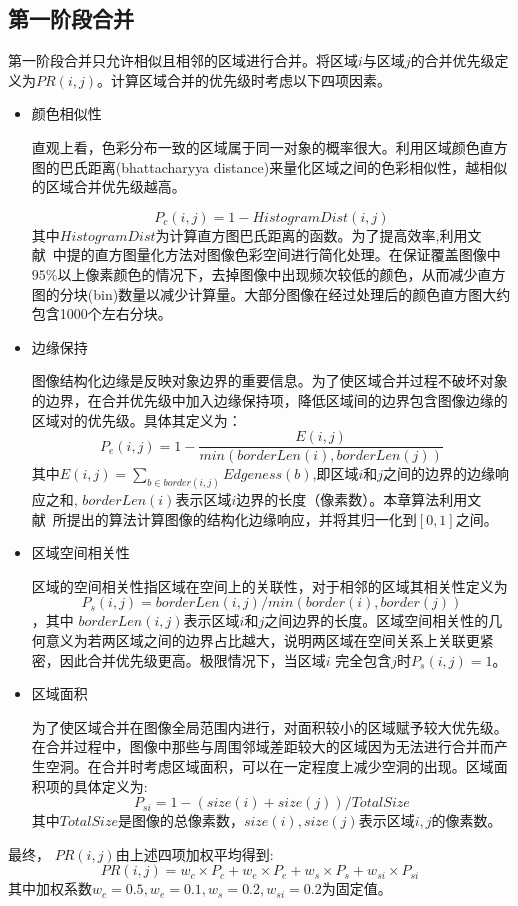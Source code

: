 \subsection{第一阶段合并}
\label{subsec:mergeP1}
第一阶段合并只允许相似且相邻的区域进行合并。将区域$i$与区域$j$的合并优先级定义为$PR(i,j)$。计算区域合并的优先级时考虑以下四项因素。
\begin{itemize}
\item 颜色相似性\par
    直观上看，色彩分布一致的区域属于同一对象的概率很大。利用区域颜色直方图的巴氏距离(bhattacharyya distance)来量化区域之间的色彩相似性，越相似的区域合并优先级越高。

    \begin{equation}
    \label{equ:chap2:Pc}
    P_{c}(i,j)=1-HistogramDist(i,j)
    \end{equation}
    其中$HistogramDist$为计算直方图巴氏距离的函数。为了提高效率,利用文献~中提的直方图量化方法对图像色彩空间进行简化处理。在保证覆盖图像中$95\%$以上像素颜色的情况下，去掉图像中出现频次较低的颜色，从而减少直方图的分块(bin)数量以减少计算量。大部分图像在经过处理后的颜色直方图大约包含1000个左右分块。
\item 边缘保持\par
    图像结构化边缘是反映对象边界的重要信息。为了使区域合并过程不破坏对象的边界，在合并优先级中加入边缘保持项，降低区域间的边界包含图像边缘的区域对的优先级。具体其定义为：
    $$P_{e}(i,j)=1-\frac{E(i,j)}{min(borderLen(i),borderLen(j))}$$
    其中$E(i,j)=\sum_{b\in border(i,j)}Edgeness(b)$,即区域$i$和$j$之间的边界的边缘响应之和, $borderLen(i)$表示区域$i$边界的长度（像素数）。本章算法利用文献~所提出的算法计算图像的结构化边缘响应，并将其归一化到$[0,1]$之间。
\item 区域空间相关性\par
    区域的空间相关性指区域在空间上的关联性，对于相邻的区域其相关性定义为$$P_{s}(i,j)=borderLen(i,j)/min⁡(border(i),border(j))$$，其中 $borderLen(i,j)$表示区域$i$和$j$之间边界的长度。区域空间相关性的几何意义为若两区域之间的边界占比越大，说明两区域在空间关系上关联更紧密，因此合并优先级更高。极限情况下，当区域$i$ 完全包含$j$时$P_{s} (i,j)=1$。
\item 区域面积\par
    为了使区域合并在图像全局范围内进行，对面积较小的区域赋予较大优先级。在合并过程中，图像中那些与周围邻域差距较大的区域因为无法进行合并而产生空洞。在合并时考虑区域面积，可以在一定程度上减少空洞的出现。区域面积项的具体定义为:
    $$P_{si}=1-(size(i)+size(j))/TotalSize$$
其中$TotalSize$是图像的总像素数，$size(i),size(j)$表示区域$i,j$的像素数。
\end{itemize}
最终， $PR(i,j)$由上述四项加权平均得到:
\begin{equation}
   \label{equ:chap2:PR}
   PR(i,j)=w_{c}\times P_{c}+w_{e} \times P_{e} + w_{s} \times P_{s} + w_{si} \times P_{si}
\end{equation}
其中加权系数$w_c=0.5, w_e=0.1, w_s=0.2, w_{si}=0.2$为固定值。\par

